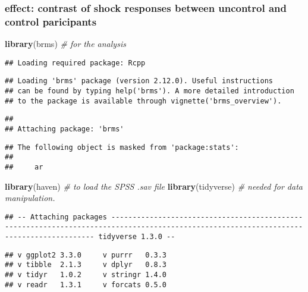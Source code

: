\documentclass[
]{article}
\newenvironment{Shaded}{\begin{snugshade}}{\end{snugshade}}
\newcommand{\CommentTok}[1]{\textcolor[rgb]{0.56,0.35,0.01}{\textit{#1}}}
\newcommand{\KeywordTok}[1]{\textcolor[rgb]{0.13,0.29,0.53}{\textbf{#1}}}
\newcommand{\NormalTok}[1]{#1}
\begin{document}
\hypertarget{effect-contrast-of-shock-responses-between-uncontrol-and-control-paricipants-1}{%
\subsubsection{effect: contrast of shock responses between uncontrol and
control
paricipants}\label{effect-contrast-of-shock-responses-between-uncontrol-and-control-paricipants-1}}

\begin{Shaded}
\begin{Highlighting}[]
\KeywordTok{library}\NormalTok{(brms) }\CommentTok{# for the analysis}
\end{Highlighting}
\end{Shaded}

\begin{verbatim}
## Loading required package: Rcpp
\end{verbatim}

\begin{verbatim}
## Loading 'brms' package (version 2.12.0). Useful instructions
## can be found by typing help('brms'). A more detailed introduction
## to the package is available through vignette('brms_overview').
\end{verbatim}

\begin{verbatim}
## 
## Attaching package: 'brms'
\end{verbatim}

\begin{verbatim}
## The following object is masked from 'package:stats':
## 
##     ar
\end{verbatim}

\begin{Shaded}
\begin{Highlighting}[]
\KeywordTok{library}\NormalTok{(haven) }\CommentTok{# to load the SPSS .sav file}
\KeywordTok{library}\NormalTok{(tidyverse) }\CommentTok{# needed for data manipulation.}
\end{Highlighting}
\end{Shaded}

\begin{verbatim}
## -- Attaching packages ---------------------------------------------------------------------------------------------------------------------------------------- tidyverse 1.3.0 --
\end{verbatim}

\begin{verbatim}
## v ggplot2 3.3.0     v purrr   0.3.3
## v tibble  2.1.3     v dplyr   0.8.3
## v tidyr   1.0.2     v stringr 1.4.0
## v readr   1.3.1     v forcats 0.5.0
\end{verbatim}
\end{document}
